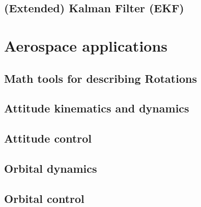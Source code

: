 \documentclass[a4paper, 12pt]{report}
\begin{document}
\chapter{(Extended) Kalman Filter (EKF)}


\part{Aerospace applications}
\chapter{Math tools for describing Rotations}

\chapter{Attitude kinematics and dynamics}
\chapter{Attitude control}
\chapter{Orbital dynamics}
\chapter{Orbital control}
\end{document}

